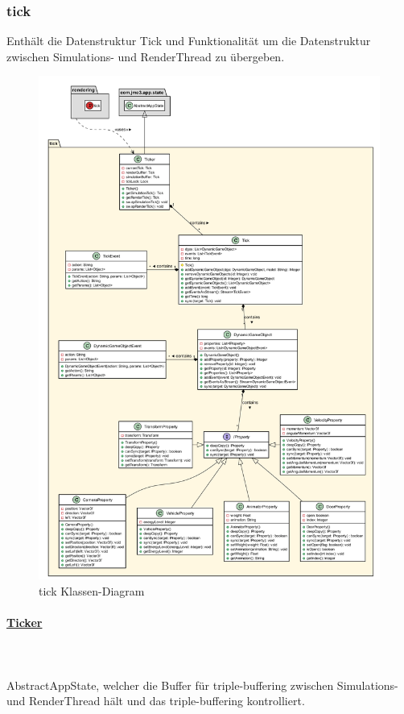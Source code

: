 \subsubsection{tick}
    Enthält die Datenstruktur Tick und Funktionalität um die Datenstruktur zwischen Simulations- und RenderThread zu übergeben.

    \begin{figure}[htbp]
        \centering
        \includegraphics[width=0.72\linewidth]{Interface/tick.png}
        \caption{tick Klassen-Diagram}
    \end{figure}

    \paragraph{\underline{Ticker}} \mbox{}\\
    \\
        AbstractAppState, welcher die Buffer für triple-buffering zwischen Simulations- und RenderThread hält und das triple-buffering kontrolliert.\par
        
